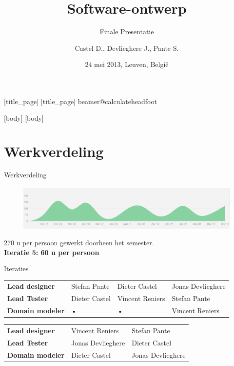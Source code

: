 \documentclass[11pt,t]{beamer}
\title{Software-ontwerp}
\author{Castel D., Devlieghere J., Pante S.}
\institute{Groep 25, Computerwetenschappen, KU Leuven}
\subtitle{Finale Presentatie}
\date{24 mei 2013, Leuven, Belgi\"{e}}
\begin{document}
	[title_page]
	[title_page]
	\csname beamer@calculateheadfoot\endcsname %
		\begin{frame}
			\titlepage
		\end{frame}
	[body]
	[body]

\section{Werkverdeling}

\begin{frame}{Werkverdeling}
\vspace{0.3in}
\begin{center}
\begin{figure}
\includegraphics[width=0.9\linewidth]{images/contribution}
\end{figure}
\vspace{0.2in}
270 u per persoon gewerkt doorheen het semester.\\
\textbf{Iteratie 5:  60 u per persoon}
\end{center}
\end{frame}

\begin{frame}{Iteraties}
\vspace{1in}
\begin{tabular}{llll}
\textbf{Lead designer} & Stefan Pante & Dieter Castel & Jonas Devlieghere  \\ 
\textbf{Lead Tester} & Dieter Castel & Vincent Reniers & Stefan Pante  \\ 
\textbf{Domain modeler} & • & • & Vincent Reniers \\ 
\end{tabular} 
\vspace{1in}
\begin{tabular}{lll}
\textbf{Lead designer} & Vincent Reniers & Stefan Pante \\ 
\textbf{Lead Tester} & Jonas Devlieghere & Dieter Castel \\ 
\textbf{Domain modeler} &Dieter Castel & Jonas Devlieghere \\ 
\end{tabular}
\end{frame}
\end{document}
